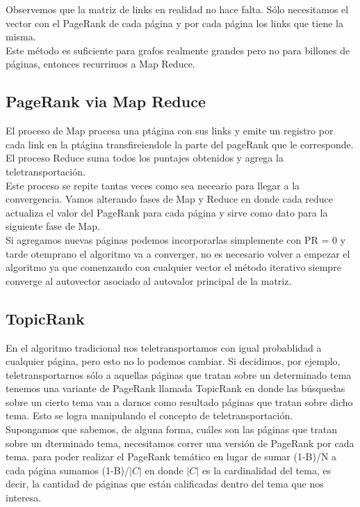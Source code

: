 \documentclass[titlepage,a4paper]{article}
\begin{document}
Observemos que la matriz de links en realidad no hace falta. Sólo necesitamos el vector con el PageRank de cada página y por cada página los links que tiene la misma. \\

Este método es suficiente para grafos realmente grandes pero no para billones de páginas, entonces recurrimos a Map Reduce. 

\subsection*{PageRank via Map Reduce}
El proceso de Map procesa una ptágina con sus links y emite un registro por cada link en la ptágina transfireiendole la parte del pageRank que le corresponde. El proceso Reduce suma todos los puntajes obtenidos y agrega la teletransportación. \\

Este proceso se repite tantas veces como sea neceario para llegar a la convergencia. Vamos alterando fases de Map y Reduce en donde cada reduce actualiza el valor del PageRank para cada página y sirve como dato para la siguiente fase de Map. \\

Si agregamos nuevas páginas podemos incorporarlas simplemente con PR = 0 y tarde otemprano el algoritmo va a converger, no es necesario  volver a empezar el algoritmo ya que comenzando con cualquier vector el método iterativo siempre converge al autovector asociado al autovalor principal de la matriz. 

\subsection*{TopicRank}
En el algoritmo tradicional nos teletransportamos con igual probablidad a cualquier página, pero esto no lo podemos cambiar. Si decidimos, por ejemplo, teletransportarnos sólo a aquellas páginas que tratan sobre un determinado tema tenemos una variante de PageRank llamada TopicRank en donde las búsquedas sobre un cierto tema van a darnos como resultado páginas que tratan sobre dicho tema. Esto se logra manipulando el concepto de teletransportación.\\
 
Supongamos que sabemos, de alguna forma, cuáles son las páginas que tratan sobre un dterminado tema, necesitamos correr una versión de PageRank por cada tema. para poder realizar el PageRank temático en lugar de sumar (1-B)/N a cada página sumamos (1-B)/$|C|$ en donde $|C|$ es la cardinalidad del tema, es decir, la cantidad de páginas que están calificadas dentro del tema que nos interesa. 
\end{document}
